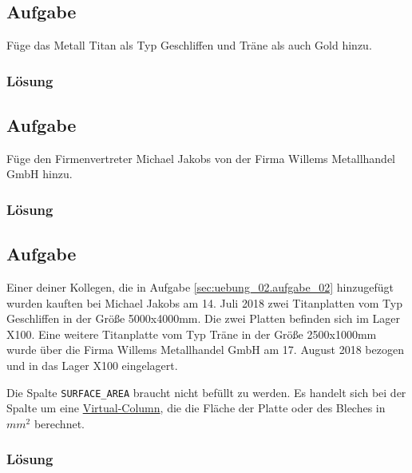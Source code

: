 \subsection{Aufgabe}
\label{sec:uebung_02.aufgabe_04}
Füge das Metall Titan als Typ Geschliffen und Träne als auch Gold hinzu.

\subsubsection*{Lösung}
\label{sec:uebung_02.aufgabe_04.loesung}

\subsection{Aufgabe}
\label{sec:uebung_02.aufgabe_05}
Füge den Firmenvertreter Michael Jakobs von der Firma Willems Metallhandel GmbH hinzu.

\subsubsection*{Lösung}
\label{sec:uebung_02.aufgabe_05.loesung}

\subsection{Aufgabe}
\label{sec:uebung_02.aufgabe_06}
Einer deiner Kollegen, die in Aufgabe \ref{sec:uebung_02.aufgabe_02} hinzugefügt wurden kauften bei Michael Jakobs am 14. Juli 2018 zwei Titanplatten vom Typ Geschliffen in der Größe 5000x4000mm. Die zwei Platten befinden sich im Lager X100. Eine weitere Titanplatte vom Typ Träne in der Größe 2500x1000mm wurde über die Firma  Willems Metallhandel GmbH am 17. August 2018 bezogen und in das Lager X100 eingelagert.

\begin{info-popup}
  Die Spalte \texttt{SURFACE\_AREA} braucht nicht befüllt zu werden. Es handelt sich bei der Spalte um eine \href{https://oracle-base.com/articles/11g/virtual-columns-11gr1}{Virtual-Column}, die die Fläche der Platte oder des Bleches in $mm^2$ berechnet.
\end{info-popup}

\subsubsection*{Lösung}
\label{sec:uebung_02.aufgabe_06.loesung}

